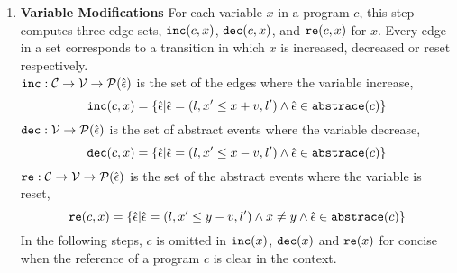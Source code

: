 \begin{enumerate}
\item \textbf{Variable Modifications}
For each variable $x$ in a program $c$, this step computes three edge sets, $\mathtt{inc}(c, x)$, $\mathtt{dec}(c, x)$,
  and $\mathtt{re}(c, x)$ for $x$.
  Every edge in a set corresponds to a transition in which $x$ is increased,
  decreased
  or reset
  respectively.
  \\
  $\mathtt{inc}: \mathcal{C} \to \mathcal{V} \to \mathcal{P}(\hat{\mathtt{\epsilon}{}}) $
  is the set of the edges where the variable increase, 
  \[ \inc(c, x) = \left\{ \absevent | \absevent = (l, x' \leq x + v, l') \land \absevent \in \absflow(c) \right\} \]
  $\mathtt{dec}: \mathcal{V} \to \mathcal{P}(\hat{\mathtt{\epsilon}{}}) $
  is the set of abstract events where the variable decrease,
  \[\dec(c, x) = \left\{\absevent| \absevent = (l,  x' \leq x - v, l') \land \absevent \in \absflow(c) \right\}\]
  $\mathtt{re}: \mathcal{C} \to \mathcal{V} \to \mathcal{P}(\hat{\mathtt{\epsilon}{}}) $ is the set of the abstract events where the variable is reset,
%
  \[\reset(c, x) = \left\{ \absevent| \absevent = (l,  x' \leq y - v, l') \land x \neq y \land \absevent \in \absflow(c) \right\}\]
%
In the following steps, $c$ is omitted in $\mathtt{inc}(x)$,
$\mathtt{dec}(x)$ and $\mathtt{re}(x)$ for concise when the reference of a program $c$ is clear in the context.

\end{enumerate}
